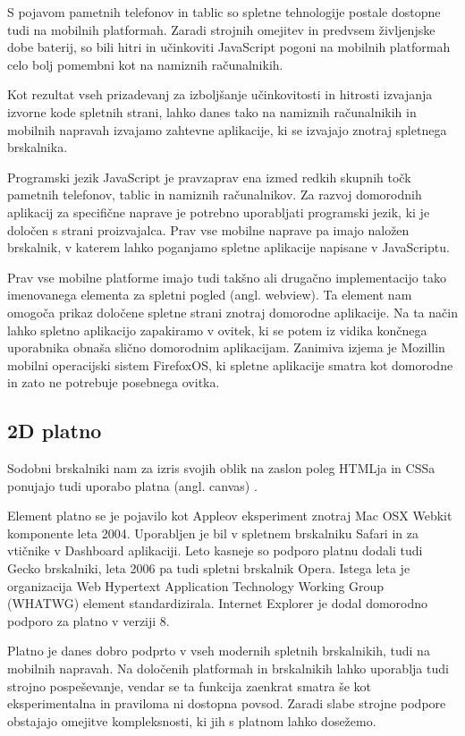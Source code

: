 S pojavom pametnih telefonov in tablic so spletne tehnologije postale dostopne tudi na mobilnih platformah. Zaradi strojnih omejitev in predvsem življenjske dobe baterij, so bili hitri in učinkoviti JavaScript pogoni na mobilnih platformah celo bolj pomembni kot na namiznih računalnikih.

Kot rezultat vseh prizadevanj za izboljšanje učinkovitosti in hitrosti izvajanja izvorne kode spletnih strani, lahko danes tako na namiznih računalnikih in mobilnih napravah izvajamo zahtevne aplikacije, ki se izvajajo znotraj spletnega brskalnika.

Programski jezik JavaScript je pravzaprav ena izmed redkih skupnih točk pametnih telefonov, tablic in namiznih računalnikov. Za razvoj domorodnih aplikacij za specifične naprave je potrebno uporabljati programski jezik, ki je določen s strani proizvajalca. Prav vse mobilne naprave pa imajo naložen brskalnik, v katerem lahko poganjamo spletne aplikacije napisane v JavaScriptu.

Prav vse mobilne platforme imajo tudi takšno ali drugačno implementacijo tako imenovanega elementa za spletni pogled (angl. webview). Ta element nam omogoča prikaz določene spletne strani znotraj domorodne aplikacije. Na ta način lahko spletno aplikacijo zapakiramo v ovitek, ki se potem iz vidika končnega uporabnika obnaša slično domorodnim aplikacijam. Zanimiva izjema je Mozillin mobilni operacijski sistem FirefoxOS, ki spletne aplikacije smatra kot domorodne in zato ne potrebuje posebnega ovitka.

\subsection{2D platno}
\label{sec:2dcanvas}
Sodobni brskalniki nam za izris svojih oblik na zaslon poleg HTMLja in CSSa ponujajo tudi uporabo platna (angl. canvas) \cite{canvas}. 

Element platno se je pojavilo kot Appleov eksperiment znotraj Mac OSX Webkit komponente leta 2004. Uporabljen je bil v spletnem brskalniku Safari in za vtičnike v Dashboard aplikaciji. Leto kasneje so podporo platnu dodali tudi Gecko brskalniki, leta 2006 pa tudi spletni brskalnik Opera. Istega leta je organizacija Web Hypertext Application Technology Working Group (WHATWG) element standardizirala. Internet Explorer je dodal domorodno podporo za platno v verziji 8.

Platno je danes dobro podprto v vseh modernih spletnih brskalnikih, tudi na mobilnih napravah. Na določenih platformah in brskalnikih lahko uporablja tudi strojno pospeševanje, vendar se ta funkcija zaenkrat smatra še kot eksperimentalna in praviloma ni dostopna povsod. Zaradi slabe strojne podpore obstajajo omejitve kompleksnosti, ki jih s platnom lahko dosežemo.

